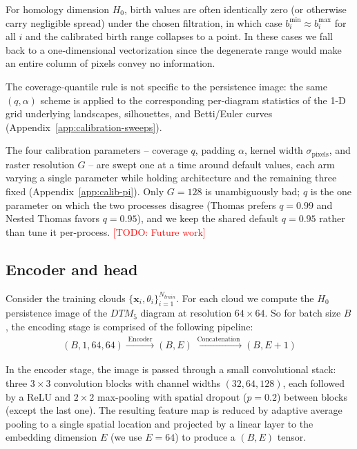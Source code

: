 \documentclass[11pt,letterpaper]{article}
\newcommand{\1}{\mathds{1}}
\newcommand{\pc}{\mathbf{x}}
\newcommand{\todo}[1]{\textcolor{red}{[TODO: #1]}}
\newcommand{\fix}[1]{\textcolor{blue}{[FIX: #1]}}
\newcommand{\todo}[1]{}\newcommand{\fix}[1]{}
\theoremstyle{plain}
\theoremstyle{definitioncolon}
\begin{document}
For homology dimension $H_0$, birth values are often identically zero (or
otherwise carry negligible spread) under the chosen filtration, in which case
$b_i^{\min} \approx b_i^{\max}$ for all $i$ and the calibrated birth range
collapses to a point. In these cases we fall back to a
one-dimensional vectorization since
the degenerate range would make an entire column of pixels convey no information.

The coverage-quantile rule is not specific to the persistence image: the
same $(q,\alpha)$ scheme is applied to the corresponding per-diagram statistics of
the 1-D grid underlying landscapes, silhouettes, and Betti/Euler curves 
(Appendix~\ref{app:calibration-sweeps}).

The four calibration parameters -- coverage $q$, padding $\alpha$, kernel width
$\sigma_{\text{pixels}}$, and raster resolution $G$ -- are swept one at a time
around default values, each arm varying a single parameter while holding
architecture and the remaining three fixed
(Appendix~\ref{app:calib-pi}). Only $G=128$ is unambiguously bad; $q$ is the one
parameter on which the two processes disagree (Thomas prefers $q=0.99$ and Nested Thomas
favors $q=0.95$), and we keep the shared
default $q=0.95$ rather than tune it per-process. \todo{Future work}

\subsection{Encoder and head}
\label{ssec:encoder-fusion}

Consider the training clouds $\{\pc_i, \theta_i\}_{i=1}^{N_{train}}$. For each
cloud we compute the $H_0$ persistence image of the $DTM_5$ diagram at
resolution $64 \times 64$. So for batch size $B$, the encoding stage is
comprised of the following pipeline:
    \begin{align*}
    (B, 1, 64, 64) \xrightarrow{\;\text{Encoder}\;} (B,E) \xrightarrow{\;\text{Concatenation}\;} (B,E+1)
    \end{align*}

In the encoder stage, the image is passed through a small
convolutional stack: three $3\times3$ convolution blocks with channel widths
$(32, 64, 128)$, each followed by a ReLU and $2\times2$ max-pooling with
spatial dropout ($p=0.2$) between blocks (except the last one). The resulting
feature map is reduced by adaptive average pooling to a single spatial location
and projected by a linear layer to the embedding dimension $E$ (we use $E=64$)
to produce a $(B, E)$ tensor.
\end{document}
